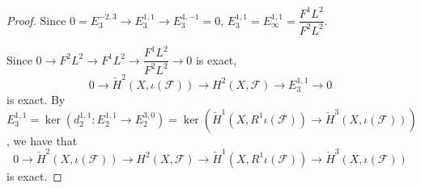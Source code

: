 \documentclass{amsart}
\numberwithin{equation}{section}
\theoremstyle{plain}
\theoremstyle{definition}
\begin{document}
\begin{proof}
	Since $ 0=E_3^{-2,3}\to E_3^{1,1}\to  E_3^{4,-1}=0  $, $ E_3^{1,1}= E_{\infty}^{1,1}=\dfrac{F^1L^2}{F^2L^2}$. 	
	
	Since $ 0\to F^2L^2\to F^1L^2\to \dfrac{F^1L^2}{F^2L^2}\to 0 $ is exact, $$0\to \check{H}^2(X,\iota(\mathscr F))\to H^2(X, \mathscr F)\to E_3^{1,1}\to 0$$ is exact. 
	By $E_3^{1,1}=\ker(d_2^{1,1}:E_2^{1,1}\to E_2^{3,0})=\ker(\check{H}^1(X, R^1\iota(\mathscr F))\to \check{H}^3(X, \iota(\mathscr F)))$, we have that 
	$$0\to \check{H}^2(X,\iota(\mathscr F))\to H^2(X, \mathscr F)\to \check{H}^1(X, R^1\iota(\mathscr F))\to \check{H}^3(X, \iota(\mathscr F))$$is exact. 
%	
\end{proof}
\end{document}
